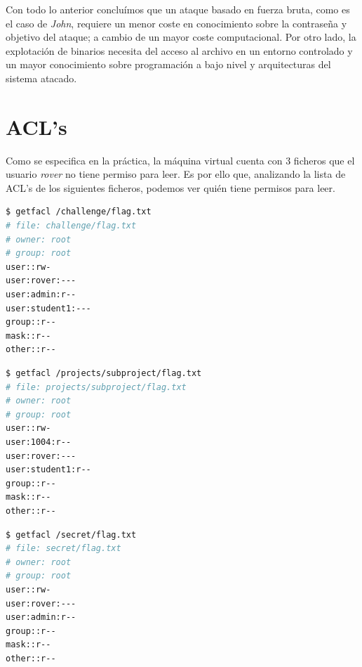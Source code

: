 \documentclass[]{article}
\begin{document}
Con todo lo anterior concluímos que un ataque basado en fuerza bruta, como es el caso de \textit{John}, requiere un menor coste en conocimiento sobre la contraseña y objetivo del ataque; a cambio de un mayor coste computacional. Por otro lado, la explotación de binarios necesita del acceso al archivo en un entorno controlado y un mayor conocimiento sobre programación a bajo nivel y arquitecturas del sistema atacado.

\section{ACL's}
\label{sec:acl}
Como se especifica en la práctica, la máquina virtual cuenta con 3 ficheros que el usuario \textit{rover} no tiene permiso para leer. Es por ello que, analizando la lista de ACL's de los siguientes ficheros, podemos ver quién tiene permisos para leer.

\vspace{0.5cm}

\begin{minipage}{\textwidth}
\begin{minipage}[t]{0.3\textwidth}
\begin{lstlisting}[showlines=true,language=bash]
$ getfacl /challenge/flag.txt
# file: challenge/flag.txt
# owner: root
# group: root
user::rw-
user:rover:---
user:admin:r--
user:student1:---
group::r--
mask::r--
other::r--


\end{lstlisting}
\end{minipage}
\begin{minipage}[t]{0.3\textwidth}
\begin{lstlisting}[language=bash]
$ getfacl /projects/subproject/flag.txt
# file: projects/subproject/flag.txt
# owner: root
# group: root
user::rw-
user:1004:r--
user:rover:---
user:student1:r--
group::r--
mask::r--
other::r--

\end{lstlisting}
\end{minipage}
\begin{minipage}[t]{0.3\textwidth}
\begin{lstlisting}[showlines=true, language=bash]
$ getfacl /secret/flag.txt
# file: secret/flag.txt
# owner: root
# group: root
user::rw-
user:rover:---
user:admin:r--
group::r--
mask::r--
other::r--



\end{lstlisting}
\end{minipage}
\end{minipage}
\end{document}
